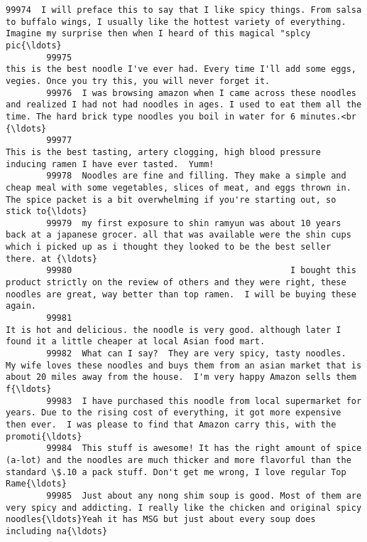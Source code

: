 \documentclass[11pt]{article}
\begin{document}
\begin{Verbatim}[commandchars=\\\{\}]
        99974  I will preface this to say that I like spicy things. From salsa to buffalo wings, I usually like the hottest variety of everything. Imagine my surprise then when I heard of this magical "splcy pic{\ldots}  
        99975                                                                               this is the best noodle I've ever had. Every time I'll add some eggs, vegies. Once you try this, you will never forget it.  
        99976  I was browsing amazon when I came across these noodles and realized I had not had noodles in ages. I used to eat them all the time. The hard brick type noodles you boil in water for 6 minutes.<br {\ldots}  
        99977                                                                                                 This is the best tasting, artery clogging, high blood pressure inducing ramen I have ever tasted.  Yumm!  
        99978  Noodles are fine and filling. They make a simple and cheap meal with some vegetables, slices of meat, and eggs thrown in. The spice packet is a bit overwhelming if you're starting out, so stick to{\ldots}  
        99979  my first exposure to shin ramyun was about 10 years back at a japanese grocer. all that was available were the shin cups which i picked up as i thought they looked to be the best seller there. at {\ldots}  
        99980                                           I bought this product strictly on the review of others and they were right, these noodles are great, way better than top ramen.  I will be buying these again.  
        99981                                                                                   It is hot and delicious. the noodle is very good. although later I found it a little cheaper at local Asian food mart.  
        99982  What can I say?  They are very spicy, tasty noodles.  My wife loves these noodles and buys them from an asian market that is about 20 miles away from the house.  I'm very happy Amazon sells them f{\ldots}  
        99983  I have purchased this noodle from local supermarket for years. Due to the rising cost of everything, it got more expensive then ever.  I was please to find that Amazon carry this, with the promoti{\ldots}  
        99984  This stuff is awesome! It has the right amount of spice (a-lot) and the noodles are much thicker and more flavorful than the standard \$.10 a pack stuff. Don't get me wrong, I love regular Top Rame{\ldots}  
        99985  Just about any nong shim soup is good. Most of them are very spicy and addicting. I really like the chicken and original spicy noodles{\ldots}Yeah it has MSG but just about every soup does including na{\ldots}  

\end{Verbatim}
\end{document}
